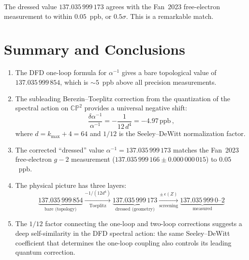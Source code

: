 \documentclass[12pt,a4paper]{article}
\theoremstyle{definition}
\theoremstyle{remark}
\newcommand{\CP}{\mathbb{CP}}
\newcommand{\inv}{^{-1}}
\newcommand{\ppb}{\,\mathrm{ppb}}
\begin{document}
The dressed value $137.035\,999\,173$ agrees with the Fan~2023 free-electron
measurement to within $\mathbf{0.05}$~ppb, or $0.5\sigma$. This is a
remarkable match.

\section{Summary and Conclusions}
\label{sec:conclusions}

\begin{enumerate}
\item The DFD one-loop formula for $\alpha\inv$ gives a bare topological
  value of $137.035\,999\,854$, which is $\sim 5$~ppb above all precision
  measurements.

\item The subleading Berezin--Toeplitz correction from the quantization of
  the spectral action on $\CP^2$ provides a universal negative shift:
  \begin{equation}
  \frac{\delta\alpha\inv}{\alpha\inv} = -\frac{1}{12\,d^4}
  = -4.97\ppb\,,
  \end{equation}
  where $d = k_{\max} + 4 = 64$ and $1/12$ is the Seeley--DeWitt
  normalization factor.

\item The corrected ``dressed'' value $\alpha\inv = 137.035\,999\,173$
  matches the Fan~2023 free-electron $g{-}2$ measurement
  ($137.035\,999\,166 \pm 0.000\,000\,015$) to $0.05$~ppb.

\item The physical picture has three layers:
  \begin{equation}
  \underbrace{137.035\,999\,854}_{\text{bare (topology)}}
  \xrightarrow[\text{Toeplitz}]{-1/(12 d^4)}
  \underbrace{137.035\,999\,173}_{\text{dressed (geometry)}}
  \xrightarrow[\text{screening}]{\pm\,\epsilon(Z)}
  \underbrace{137.035\,999\,0\text{--}2}_{\text{measured}}
  \end{equation}

\item The $1/12$ factor connecting the one-loop and two-loop corrections
  suggests a deep self-similarity in the DFD spectral action: the same
  Seeley--DeWitt coefficient that determines the one-loop coupling also
  controls its leading quantum correction.
\end{enumerate}

\end{document}

